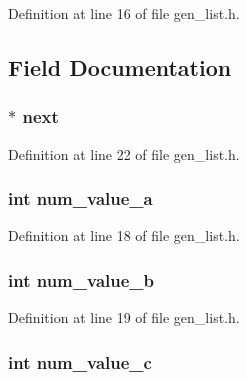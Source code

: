 Definition at line 16 of file gen\-\_\-list.\-h.



\subsection{Field Documentation}
\hypertarget{structs__list_afb31ca295a227d12dae42eb9d7a61f40}{
\subsubsection[{next}]{$\ast$ next}}\label{structs__list_afb31ca295a227d12dae42eb9d7a61f40}


Definition at line 22 of file gen\-\_\-list.\-h.

\hypertarget{structs__list_a08f6b479f237e672809735f0764104e6}{
\subsubsection[{num\-\_\-value\-\_\-a}]{\setlength{\rightskip}{0pt plus 5cm}int num\-\_\-value\-\_\-a}}\label{structs__list_a08f6b479f237e672809735f0764104e6}


Definition at line 18 of file gen\-\_\-list.\-h.

\hypertarget{structs__list_a067e0fca9eda0eeac39cd8c6e7fe50c5}{
\subsubsection[{num\-\_\-value\-\_\-b}]{\setlength{\rightskip}{0pt plus 5cm}int num\-\_\-value\-\_\-b}}\label{structs__list_a067e0fca9eda0eeac39cd8c6e7fe50c5}


Definition at line 19 of file gen\-\_\-list.\-h.

\hypertarget{structs__list_a6709d69fcc8bb060ac025b812ac45550}{
\subsubsection[{num\-\_\-value\-\_\-c}]{\setlength{\rightskip}{0pt plus 5cm}int num\-\_\-value\-\_\-c}}\label{structs__list_a6709d69fcc8bb060ac025b812ac45550}


